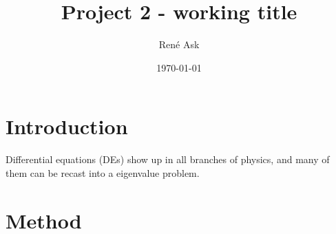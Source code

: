 \documentclass[english,notitlepage,reprint]{revtex4-1}  %
\begin{document}
\title{Project 2 - working title}      %
\author{René Ask}          %
\date{\today}                             %
\noaffiliation                            %
\maketitle                                %

\section{Introduction}
Differential equations (DEs) show up in all branches of physics, and many of them can be recast into a eigenvalue problem. 
\section{Method}
\end{document}
